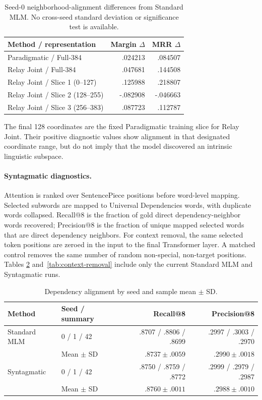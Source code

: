 \begin{table}[H]
\centering
\small
\begin{tabular}{lrr}
\toprule
Method / representation & Margin $\Delta$ & MRR $\Delta$ \\
\midrule
Paradigmatic / Full-384 & .024213 & .084507 \\
Relay Joint / Full-384 & .047681 & .144508 \\
Relay Joint / Slice 1 (0--127) & .125988 & .218807 \\
Relay Joint / Slice 2 (128--255) & -.082908 & -.046663 \\
Relay Joint / Slice 3 (256--383) & .087723 & .112787 \\
\bottomrule
\end{tabular}
\caption{Seed-0 neighborhood-alignment differences from Standard MLM.
No cross-seed standard deviation or significance test is available.}
\label{tab:para-probe}
\end{table}

The final 128 coordinates are the fixed Paradigmatic training slice
for Relay Joint. Their positive diagnostic values show alignment in
that designated coordinate range, but do not imply that the model
discovered an intrinsic linguistic subspace.

\paragraph{Syntagmatic diagnostics.}
Attention is ranked over SentencePiece positions before word-level
mapping. Selected subwords are mapped to Universal Dependencies words,
with duplicate words collapsed. Recall@8 is the fraction of gold direct
dependency-neighbor words recovered; Precision@8 is the fraction of
unique mapped selected words that are direct dependency neighbors. For
context removal, the same selected token positions are zeroed in the
input to the final Transformer layer. A matched control removes the
same number of random non-special, non-target positions. Tables
\ref{tab:dependency} and~\ref{tab:context-removal} include only the
current Standard MLM and Syntagmatic runs.

\begin{table}[H]
\centering
\small
\begin{tabular}{llrr}
\toprule
Method & Seed / summary & Recall@8 & Precision@8 \\
\midrule
Standard MLM & 0 / 1 / 42 & .8707 / .8806 / .8699 & .2997 / .3003 / .2970 \\
 & Mean $\pm$ SD & $.8737\pm.0059$ & $.2990\pm.0018$ \\
Syntagmatic & 0 / 1 / 42 & .8750 / .8759 / .8772 & .2999 / .2979 / .2987 \\
 & Mean $\pm$ SD & $.8760\pm.0011$ & $.2988\pm.0010$ \\
\bottomrule
\end{tabular}
\caption{Dependency alignment by seed and sample mean $\pm$ SD.}
\label{tab:dependency}
\end{table}

